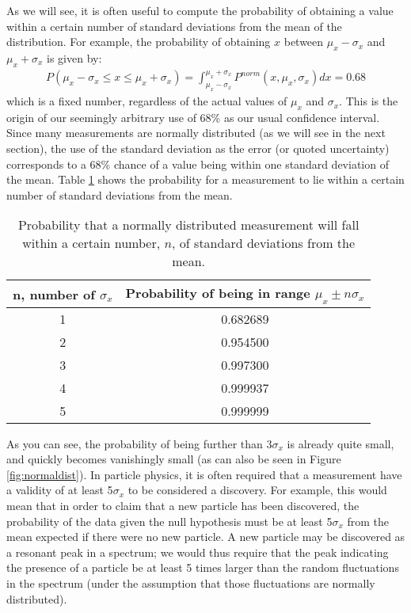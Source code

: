 As we will see, it is often useful to compute the probability of obtaining a value within a certain number of standard deviations from the mean of the distribution. For example, the probability of obtaining $x$ between $\mu_x-\sigma_x$ and $\mu_x+\sigma_x$ is given by:
 \begin{align}
P(\mu_x-\sigma_x \leq x \leq \mu_x+\sigma_x) = \int_{\mu_x-\sigma_x}^{\mu_x+\sigma_x}P^{norm}(x,\mu_x,\sigma_x)dx=0.68
\end{align}
which is a fixed number, regardless of the actual values of $\mu_x$ and $\sigma_x$. This is the origin of our seemingly arbitrary use of 68\% as our usual confidence interval. Since many measurements are normally distributed (as we will see in the next section), the use of the standard deviation as the error (or quoted uncertainty) corresponds to a 68\% chance of a value being within one standard deviation of the mean. Table \ref{tab:normsigma} shows the probability for a measurement to lie within a certain number of standard deviations from the mean.
\begin{table}[h!]
\center
\begin{tabular}{|c|c|}
\hline
\textbf{n, number of $\sigma_x$} & \textbf{Probability of being in range $\mu_x\pm n\sigma_x$}\\
\hline
1 & 0.682689\\
2 & 0.954500\\
3 & 0.997300\\
4 & 0.999937\\
5 & 0.999999\\
\hline
\end{tabular}
\caption{\label{tab:normsigma}Probability that a normally distributed measurement will fall within a certain number, $n$, of standard deviations from the mean.}
\end{table}

As you can see, the probability of being further than 3$\sigma_x$ is already quite small, and quickly becomes vanishingly small (as can also be seen in Figure \ref{fig:normaldist}). In particle physics, it is often required that a measurement have a validity of at least 5$\sigma_x$ to be considered a discovery. For example, this would mean that in order to claim that a new particle has been discovered, the probability of the data given the null hypothesis must be at least 5$\sigma_x$ from the mean expected if there were no new particle. A new particle may be discovered as a resonant peak in a spectrum; we would thus require that the peak indicating the presence of a particle be at least 5 times larger than the random fluctuations in the spectrum (under the assumption that those fluctuations are normally distributed).

